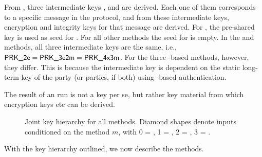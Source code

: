 From \mGxy{}, three intermediate keys \mPRKtwo, \mPRKthree{} and
\mPRKthree{} are derived.
%
Each one of them corresponds to a specific message in the protocol, and from these intermediate keys, encryption and integrity keys for that message are derived.
%
For \mPskPsk{}, the pre-shared key is used as seed for \mPRKtwo. For all other methods the seed for \mPRKtwo{} is empty.
%
In the \mPskPsk{} and \mSigSig{} methods, all three intermediate keys
are the same, i.e., $\text{\textup{\textsf{PRK\_2e}}}{} = \text{\textup{\textsf{PRK\_3e2m}}}{} = \text{\textup{\textsf{PRK\_4x3m}}}$.
%
For the three \mStat-based methods, however, they differ. This is because the intermediate key \mPRKthree{} is dependent on the static long-term key of the party (or parties, if both) using \mStat{}-based authentication.
%

The result of an \mEdhoc{} run is not a key per se, but rather key material from which encryption keys etc can be derived.

%


\begin{figure}[!h]
\scalebox{.75}{

}
\caption{Joint key hierarchy for all methods. Diamond shapes denote inputs conditioned on the method $m$, with 0 = \mSigSig, 1 = \mSigStat, 2 = \mStatSig, 3 = \mStatStat.}
\label{fig:kdfdiagram}
\end{figure}

With the key hierarchy outlined, we now describe the \mEdhoc{} methods.
%
%
%
\spacehack
